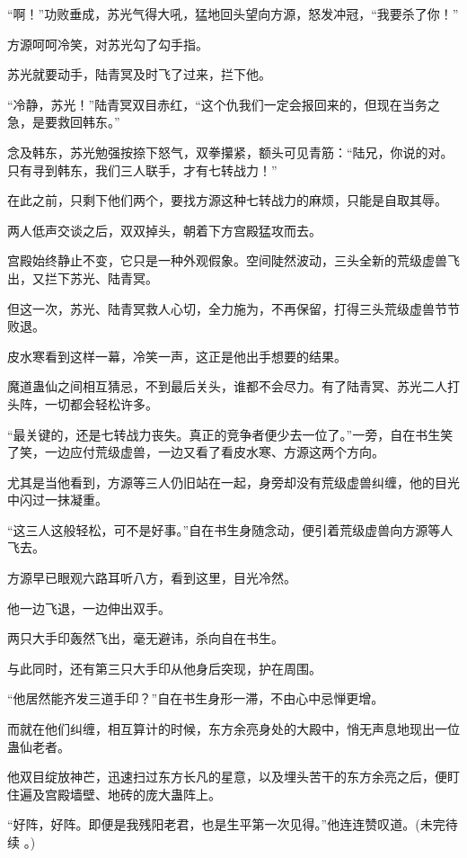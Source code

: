 \begin{this_body}
“啊！”功败垂成，苏光气得大吼，猛地回头望向方源，怒发冲冠，“我要杀了你！”

方源呵呵冷笑，对苏光勾了勾手指。

苏光就要动手，陆青冥及时飞了过来，拦下他。

“冷静，苏光！”陆青冥双目赤红，“这个仇我们一定会报回来的，但现在当务之急，是要救回韩东。”

念及韩东，苏光勉强按捺下怒气，双拳攥紧，额头可见青筋：“陆兄，你说的对。只有寻到韩东，我们三人联手，才有七转战力！”

在此之前，只剩下他们两个，要找方源这种七转战力的麻烦，只能是自取其辱。

两人低声交谈之后，双双掉头，朝着下方宫殿猛攻而去。

宫殿始终静止不变，它只是一种外观假象。空间陡然波动，三头全新的荒级虚兽飞出，又拦下苏光、陆青冥。

但这一次，苏光、陆青冥救人心切，全力施为，不再保留，打得三头荒级虚兽节节败退。

皮水寒看到这样一幕，冷笑一声，这正是他出手想要的结果。

魔道蛊仙之间相互猜忌，不到最后关头，谁都不会尽力。有了陆青冥、苏光二人打头阵，一切都会轻松许多。

“最关键的，还是七转战力丧失。真正的竞争者便少去一位了。”一旁，自在书生笑了笑，一边应付荒级虚兽，一边又看了看皮水寒、方源这两个方向。

尤其是当他看到，方源等三人仍旧站在一起，身旁却没有荒级虚兽纠缠，他的目光中闪过一抹凝重。

“这三人这般轻松，可不是好事。”自在书生身随念动，便引着荒级虚兽向方源等人飞去。

方源早已眼观六路耳听八方，看到这里，目光冷然。

他一边飞退，一边伸出双手。

两只大手印轰然飞出，毫无避讳，杀向自在书生。

与此同时，还有第三只大手印从他身后突现，护在周围。

“他居然能齐发三道手印？”自在书生身形一滞，不由心中忌惮更增。

而就在他们纠缠，相互算计的时候，东方余亮身处的大殿中，悄无声息地现出一位蛊仙老者。

他双目绽放神芒，迅速扫过东方长凡的星意，以及埋头苦干的东方余亮之后，便盯住遍及宫殿墙壁、地砖的庞大蛊阵上。

“好阵，好阵。即便是我残阳老君，也是生平第一次见得。”他连连赞叹道。(未完待续 。)

\end{this_body}

